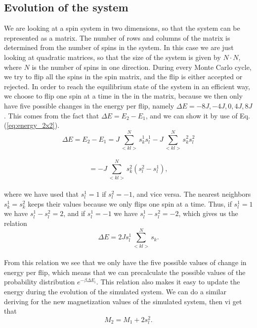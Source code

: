 \documentclass[12pt]{article}
\begin{document}
\begin{flushleft}
\subsection{Evolution of the system}
We are looking at a spin system in two dimensions, so that the system can be represented as a matrix. The number of rows and columns of the matrix is determined from the number of spins in the system. In this case we are just looking at quadratic matrices, so that the size of the system is given by $N\cdot N$, where $N$ is the number of spins in one direction. During every Monte Carlo cycle, we try to flip all the spins in the spin matrix, and the flip is either accepted or rejected. In order to reach the equilibrium state of the system in an efficient way, we choose to flip one spin at a time in the in the matrix, because we then only have five possible changes in the energy per flip, namely $\Delta E = -8J, -4J, 0, 4J, 8J$. This comes from the fact that $\Delta E = E_2 - E_1$, and we can show it by use of Eq. (\ref{eq:energy_2x2}).
\vspace{5mm}
$$\Delta E = E_2 - E_1 = J\sum\limits_{<kl>}^{N}s_k^1 s_l^1 -J\sum\limits_{<kl>}^{N}s_k^2 s_l^2$$\\
\vspace{5mm}
$$ = -J\sum\limits_{<kl>}^{N} s_k^2(s_l^2 -  s_l^1),$$\\
\vspace{5mm}
where we have used that $s_l^1 = 1$ if $s_l^2 = -1$, and vice versa. The nearest neighbors $s_k^1 = s_k^2$ keeps their values because we only flips one spin at a time. Thus, if $s_l^1 = 1$ we have $s_l^1 - s_l^2 = 2$, and if $s_l^1 = -1$ we have $s_l^1 - s_l^2 = -2$, which gives us the relation
\vspace{5mm}
$$\Delta E = 2Js_l^1\sum\limits_{<kl>}^{N} s_k.$$\\
\vspace{5mm} 
From this relation we see that we only have the five possible values of change in energy per flip, which means that we can precalculate the possible values of the probability distribution $e^{-\beta\Delta E_i}$. This relation also makes it easy to update the energy during the evolution of the simulated system. We can do a similar deriving for the new magnetization values of the simulated system, then vi get that
\vspace{5mm}
$$M_2 = M_1 + 2s_l^2.$$\\ 
\vspace{5mm}


\end{flushleft}
\end{document}
